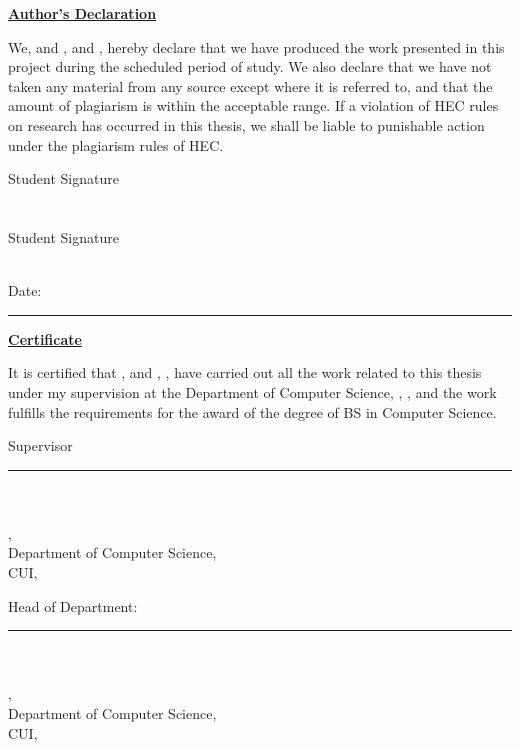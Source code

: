 \begin{center}{\LARGE\bfseries\underline{Author's Declaration}}\end{center}
\vspace{0.4cm}
We, \studentA{} and \studentB, \regA{} and \regB, hereby declare that we have produced the work presented in this project during the scheduled period of study. We also declare that we have not taken any material from any source except where it is referred to, and that the amount of plagiarism is within the acceptable range. If a violation of HEC rules on research has occurred in this thesis, we shall be liable to punishable action under the plagiarism rules of HEC.
\vspace{2.5cm}
\begin{flushright}
Student Signature\\[0.6cm]
\studentA\\ \regA\\[1cm]
Student Signature\\[0.6cm]
\studentB\\ \regB
\end{flushright}
\vspace{0.8cm}
Date: \rule{4cm}{0.4pt}
\clearpage

\begin{center}{\LARGE\bfseries\underline{Certificate}}\end{center}
\vspace{0.4cm}
It is certified that \studentA, \regA{} and \studentB, \regB, have carried out all the work related to this thesis under my supervision at the Department of Computer Science, \university, \campus, and the work fulfills the requirements for the award of the degree of BS in Computer Science.
\vspace{2cm}
\begin{flushright}
Supervisor\\[1cm]\rule{4.5cm}{0.4pt}\\[0.6cm]
\supervisor\\ \supervisordesignation,\\ Department of Computer Science,\\ CUI, \campus
\end{flushright}
\vspace{0.6cm}
Head of Department:\\[1cm]\rule{4.5cm}{0.4pt}\\[0.6cm]
\hod\\ \hoddesignation,\\ Department of Computer Science,\\ CUI, \campus
\clearpage

